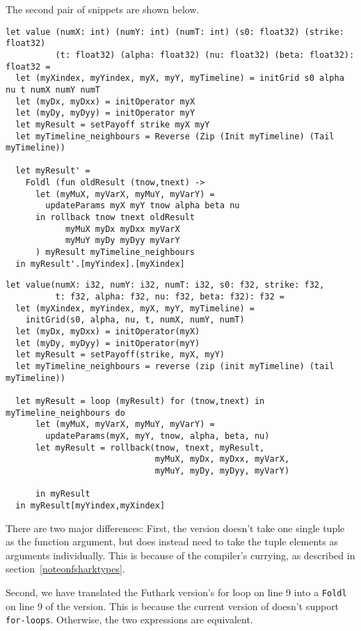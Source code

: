 The second pair of snippets are shown below.

\begin{verbatim}
let value (numX: int) (numY: int) (numT: int) (s0: float32) (strike: float32) 
          (t: float32) (alpha: float32) (nu: float32) (beta: float32): float32 =
  let (myXindex, myYindex, myX, myY, myTimeline) = initGrid s0 alpha nu t numX numY numT
  let (myDx, myDxx) = initOperator myX
  let (myDy, myDyy) = initOperator myY
  let myResult = setPayoff strike myX myY
  let myTimeline_neighbours = Reverse (Zip (Init myTimeline) (Tail myTimeline))

  let myResult' = 
    Foldl (fun oldResult (tnow,tnext) ->
      let (myMuX, myVarX, myMuY, myVarY) =
        updateParams myX myY tnow alpha beta nu
      in rollback tnow tnext oldResult
            myMuX myDx myDxx myVarX
            myMuY myDy myDyy myVarY
      ) myResult myTimeline_neighbours
  in myResult'.[myYindex].[myXindex]
\end{verbatim}

\begin{lstlisting}[language=Futhark, basicstyle=\footnotesize\ttfamily]
let value(numX: i32, numY: i32, numT: i32, s0: f32, strike: f32, 
          t: f32, alpha: f32, nu: f32, beta: f32): f32 =
  let (myXindex, myYindex, myX, myY, myTimeline) =
    initGrid(s0, alpha, nu, t, numX, numY, numT)
  let (myDx, myDxx) = initOperator(myX)
  let (myDy, myDyy) = initOperator(myY)
  let myResult = setPayoff(strike, myX, myY)
  let myTimeline_neighbours = reverse (zip (init myTimeline) (tail myTimeline))

  let myResult = loop (myResult) for (tnow,tnext) in myTimeline_neighbours do
      let (myMuX, myVarX, myMuY, myVarY) =
        updateParams(myX, myY, tnow, alpha, beta, nu)
      let myResult = rollback(tnow, tnext, myResult,
                              myMuX, myDx, myDxx, myVarX,
                              myMuY, myDy, myDyy, myVarY)

      in myResult
  in myResult[myYindex,myXindex]
\end{lstlisting}
There are two major differences: First, the \fshark{} version doesn't take one
single tuple as the function argument, but does instead need to take the tuple
elements as arguments individually. This is because of the \fsharp{} compiler's
currying, as described in section~\ref{noteonfsharktypes}.

Second, we have translated the Futhark version's for loop on line 9 into a
\texttt{Foldl} on line 9 of the \fshark{} version. This is because the current
version of \fshark{} doesn't support \texttt{for-loops}.
Otherwise, the two expressions are equivalent.

